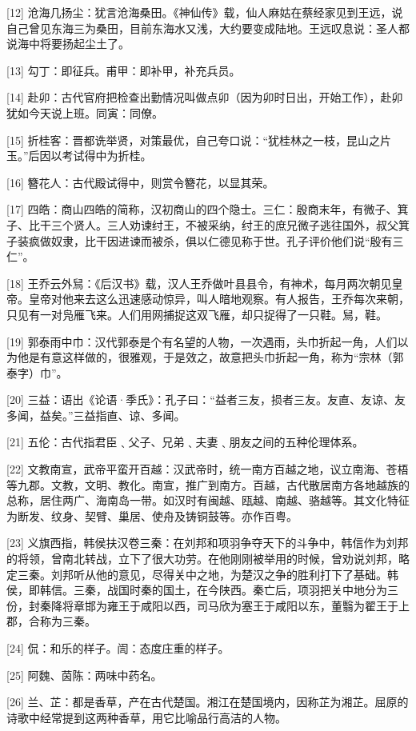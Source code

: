 \documentclass[12pt,UTF8]{ctexbook}
\begin{document}
[12] 沧海几扬尘：犹言沧海桑田。《神仙传》载，仙人麻姑在蔡经家见到王远，说自己曾见东海三为桑田，目前东海水又浅，大约要变成陆地。王远叹息说：圣人都说海中将要扬起尘土了。

[13] 勾丁：即征兵。甫甲：即补甲，补充兵员。

[14] 赴卯：古代官府把检查出勤情况叫做点卯（因为卯时日出，开始工作），赴卯犹如今天说上班。同寅：同僚。

[15] 折桂客：晋都诜举贤，对策最优，自己夸口说：“犹桂林之一枝，昆山之片玉。”后因以考试得中为折桂。

[16] 簪花人：古代殿试得中，则赏令簪花，以显其荣。

[17] 四皓：商山四皓的简称，汉初商山的四个隐士。三仁：殷商末年，有微子、箕子、比干三个贤人。三人劝谏纣王，不被采纳，纣王的庶兄微子逃往国外，叔父箕子装疯做奴隶，比干因进谏而被杀，俱以仁德见称于世。孔子评价他们说“殷有三仁”。

[18] 王乔云外舃：《后汉书》载，汉人王乔做叶县县令，有神术，每月两次朝见皇帝。皇帝对他来去这么迅速感动惊异，叫人暗地观察。有人报告，王乔每次来朝，只见有一对凫雁飞来。人们用网捕捉这双飞雁，却只捉得了一只鞋。舃，鞋。

[19] 郭泰雨中巾：汉代郭泰是个有名望的人物，一次遇雨，头巾折起一角，人们以为他是有意这样做的，很雅观，于是效之，故意把头巾折起一角，称为“宗林（郭泰字）巾”。

[20] 三益：语出《论语·季氏》：孔子曰：“益者三友，损者三友。友直、友谅、友多闻，益矣。”三益指直、谅、多闻。

[21] 五伦：古代指君臣﹑父子、兄弟﹑夫妻﹑朋友之间的五种伦理体系。

[22] 文教南宣，武帝平蛮开百越：汉武帝时，统一南方百越之地，议立南海、苍梧等九郡。文教，文明、教化。南宣，推广到南方。百越，古代散居南方各地越族的总称，居住两广、海南岛一带。如汉时有闽越、瓯越、南越、骆越等。其文化特征为断发、纹身、契臂、巢居、使舟及铸铜鼓等。亦作百粤。

[23] 义旗西指，韩侯扶汉卷三秦：在刘邦和项羽争夺天下的斗争中，韩信作为刘邦的将领，曾南北转战，立下了很大功劳。在他刚刚被举用的时候，曾劝说刘邦，略定三秦。刘邦听从他的意见，尽得关中之地，为楚汉之争的胜利打下了基础。韩侯，即韩信。三秦，战国时秦的国土，在今陕西。秦亡后，项羽把关中地分为三份，封秦降将章邯为雍王于咸阳以西，司马欣为塞王于咸阳以东，董翳为翟王于上郡，合称为三秦。

[24] 侃：和乐的样子。訚：态度庄重的样子。

[25] 阿魏、茵陈：两味中药名。

[26] 兰、芷：都是香草，产在古代楚国。湘江在楚国境内，因称芷为湘芷。屈原的诗歌中经常提到这两种香草，用它比喻品行高洁的人物。
\end{document}
